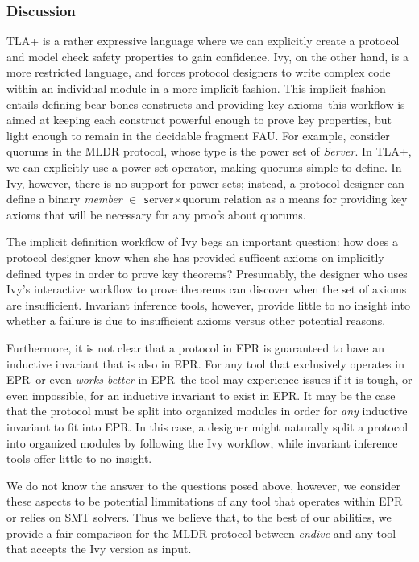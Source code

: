 \documentclass[runningheads]{llncs}
\newcommand{\ivy}[1]{{\small\texttt #1}}
\begin{document}
\subsubsection{Discussion}

TLA+ is a rather expressive language where we can explicitly create a protocol and model check safety properties to gain confidence.  Ivy, on the other hand, is a more restricted language, and forces protocol designers to write complex code within an individual module in a more implicit fashion.  This implicit fashion entails defining bear bones constructs and providing key axioms--this workflow is aimed at keeping each construct powerful enough to prove key properties, but light enough to remain in the decidable fragment FAU.  For example, consider quorums in the MLDR protocol, whose type is the power set of \textit{Server}.  In TLA+, we can explicitly use a power set operator, making quorums simple to define.  In Ivy, however, there is no support for power sets; instead, a protocol designer can define a binary \textit{member} ${\scriptstyle\in}$ \ivy{server}$\times$\ivy{quorum} relation as a means for providing key axioms that will be necessary for any proofs about quorums.

The implicit definition workflow of Ivy begs an important question: how does a protocol designer know when she has provided sufficent axioms on implicitly defined types in order to prove key theorems?  Presumably, the designer who uses Ivy's interactive workflow to prove theorems can discover when the set of axioms are insufficient.  Invariant inference tools, however,  provide little to no insight into whether a failure is due to insufficient axioms versus other potential reasons.

Furthermore, it is not clear that a protocol in EPR is guaranteed to have an inductive invariant that is also in EPR.  For any tool that exclusively operates in EPR--or even \textit{works better} in EPR--the tool may experience issues if it is tough, or even impossible, for an inductive invariant to exist in EPR.  It may be the case that the protocol must be split into organized modules in order for \textit{any} inductive invariant to fit into EPR.  In this case, a designer might naturally split a protocol into organized modules by following the Ivy workflow, while invariant inference tools offer little to no insight.

We do not know the answer to the questions posed above, however, we consider these aspects to be potential limmitations of any tool that operates within EPR or relies on SMT solvers.  Thus we believe that, to the best of our abilities, we provide a fair comparison for the MLDR protocol between \textit{endive} and any tool that accepts the Ivy version as input.
\end{document}
